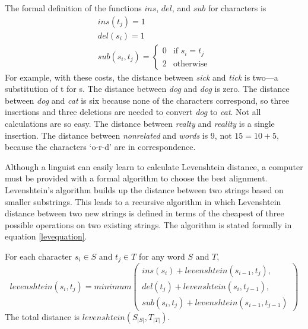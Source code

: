 \documentclass[11pt]{article}
\begin{document}
The formal definition of the functions $ins$, $del$, and $sub$
for characters is
\begin{equation}
\begin{array}{l}
   ins(t_j) = 1 \\
   del(s_i) = 1 \\
   sub(s_i,t_j) = \left\{
     \begin{array}{ll}
       0 & \textrm{if $s_i=t_j$} \\
       2 & \textrm{otherwise}
     \end{array} \right.

   \end{array}
\end{equation}
For example, with these costs, the distance between \textit{sick} and
\textit{tick} is two---a substitution of t for s. The distance between
\textit{dog} and \textit{dog} is zero. The distance between
\textit{dog} and \textit{cat} is six because none of the characters
correspond, so three insertions and three deletions are needed to
convert \textit{dog} to \textit{cat}. Not all calculations are so
easy. The distance between \textit{realty} and \textit{reality} is a
single insertion. The distance between \textit{nonrelated} and
\textit{words} is 9, not $15 =10 + 5$, because the characters `o-r-d'
are in correspondence.

Although a linguist can easily learn to calculate Levenshtein distance,
a computer must be provided with a formal algorithm to choose
the best alignment. Levenshtein's algorithm
builds up the distance between two strings based on smaller
substrings.  This leads to a recursive algorithm in which Levenshtein
distance between two new strings is defined in terms of the cheapest of
three possible operations on two existing strings. The algorithm is
stated formally in equation \ref{levequation}.

For each character $s_i \in S$ and $t_j \in T$ for any word $S$ and $T$,
\begin{equation}
  levenshtein(s_i,t_j) = minimum \left(
  \begin{array}{l}
   ins(s_i)+levenshtein(s_{i-1},t_j), \\
 del(t_j)+levenshtein(s_i,t_{j-1}), \\
 sub(s_i,t_j)+levenshtein(s_{i-1},t_{j-1})
   \end{array} \right)
   \label{levequation}
\end{equation}
The total distance is $levenshtein(S_{|S|},T_{|T|})$.

\end{document}

